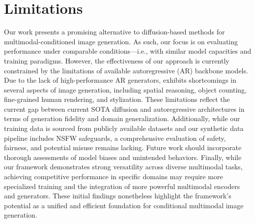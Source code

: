 \section{Limitations}
\label{app:limitation}

Our work presents a promising alternative to diffusion-based methods for multimodal-conditioned image generation. As such, our focus is on evaluating performance under comparable conditions—i.e., with similar model capacities and training paradigms.
However, the effectiveness of our approach is currently constrained by the limitations of available autoregressive (AR) backbone models. Due to the lack of high-performance AR generators, \model exhibits shortcomings in several aspects of image generation, including spatial reasoning, object counting, fine-grained human rendering, and stylization. These limitations reflect the current gap between current SOTA diffusion and autoregressive architectures in terms of generation fidelity and domain generalization.
Additionally, while our training data is sourced from publicly available datasets and our synthetic data pipeline includes NSFW safeguards, a comprehensive evaluation of safety, fairness, and potential misuse remains lacking. Future work should incorporate thorough assessments of model biases and unintended behaviors.
Finally, while our framework demonstrates strong versatility across diverse multimodal tasks, achieving competitive performance in specific domains may require more specialized training and the integration of more powerful multimodal encoders and generators. These initial findings nonetheless highlight the framework's potential as a unified and efficient foundation for conditional multimodal image generation.
